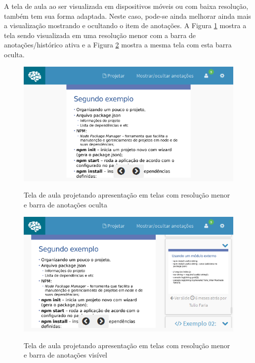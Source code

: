 A tela de aula ao ser visualizada em dispositivos móveis ou com baixa resolução, também tem sua forma adaptada. Neste caso, pode-se ainda melhorar ainda mais a visualização mostrando e ocultando o item de anotações. A Figura \ref{fig:tela_aula_mob} mostra a tela sendo visualizada em uma resolução menor com a barra de anotações/histórico ativa e a Figura \ref{fig:tela_aula_mob_anot} mostra a mesma tela com esta barra oculta.

\begin{figure}
\centering
\caption{Tela de aula projetando apresentação em telas com resolução menor e barra de anotações oculta}
\includegraphics[width=1.0\textwidth]{imgs/tela_aula_slide_mob.png} 
\label{fig:tela_aula_mob} 
\end{figure}

\begin{figure}
\centering
\caption{Tela de aula projetando apresentação em telas com resolução menor e barra de anotações visível}
\includegraphics[width=1.0\textwidth]{imgs/tela_aula_slide_mob_anotacoes.png} 
\label{fig:tela_aula_mob_anot} 
\end{figure}

